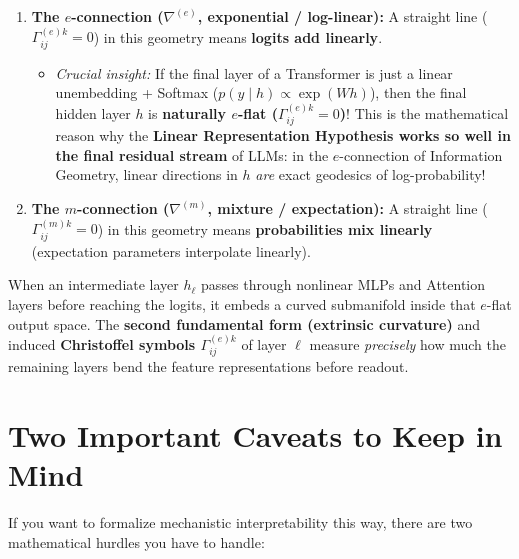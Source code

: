 \documentclass[11pt,a4paper]{article}
\begin{document}
\begin{enumerate}[leftmargin=*]
    \item \textbf{The $e$-connection ($\nabla^{(e)}$, exponential / log-linear):} A straight line ($\Gamma^{(e)k}_{ij} = 0$) in this geometry means \textbf{logits add linearly}.
    \begin{itemize}
        \item \emph{Crucial insight:} If the final layer of a Transformer is just a linear unembedding + Softmax ($p(y \mid h) \propto \exp(W h)$), then the final hidden layer $h$ is \textbf{naturally $e$-flat ($\Gamma^{(e)k}_{ij} = 0$)}! This is the mathematical reason why the \textbf{Linear Representation Hypothesis works so well in the final residual stream} of LLMs: in the $e$-connection of Information Geometry, linear directions in $h$ \emph{are} exact geodesics of log-probability!
    \end{itemize}
    \item \textbf{The $m$-connection ($\nabla^{(m)}$, mixture / expectation):} A straight line ($\Gamma^{(m)k}_{ij} = 0$) in this geometry means \textbf{probabilities mix linearly} (expectation parameters interpolate linearly).
\end{enumerate}

When an intermediate layer $h_\ell$ passes through nonlinear MLPs and Attention layers before reaching the logits, it embeds a curved submanifold inside that $e$-flat output space. The \textbf{second fundamental form (extrinsic curvature)} and induced \textbf{Christoffel symbols $\Gamma^{(e)k}_{ij}$} of layer $\ell$ measure \emph{precisely} how much the remaining layers bend the feature representations before readout.

\section{Two Important Caveats to Keep in Mind}

If you want to formalize mechanistic interpretability this way, there are two mathematical hurdles you have to handle:
\end{document}

